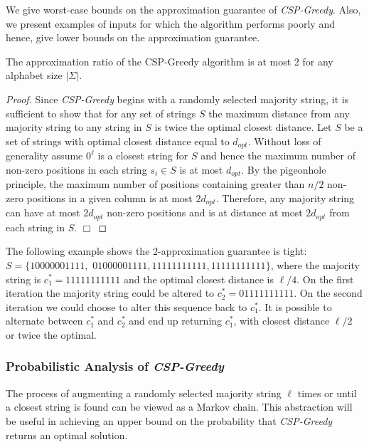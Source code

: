We give worst-case bounds on the approximation guarantee of {\em CSP-Greedy}.  Also, we present examples of inputs for which the algorithm performs poorly and hence, give lower bounds on the approximation guarantee.  

\begin{proposition} \label{2approx_theorem} The approximation ratio of the CSP-Greedy algorithm is at most 2 for any alphabet size $|\Sigma|$. \end{proposition}

\begin{proof} Since {\em CSP-Greedy} begins with a randomly selected majority string, it is sufficient to show that for any set of strings $S$ the maximum distance from any majority string to any string in $S$ is twice the optimal closest distance.  Let $S$ be a set of strings with optimal closest distance equal to $d_{opt}$.  Without loss of generality assume $0^{\ell}$ is a closest string for $S$ and hence the maximum number of non-zero positions in each string $s_i \in S$ is at most $d_{opt}$.  By the pigeonhole principle, the maximum number of positions containing greater than $n/2$ non-zero positions in a given column is at most $2d_{opt}$. Therefore, any majority string can have at most $2d_{opt}$ non-zero positions and is at distance at most $2d_{opt}$ from each string in $S$.  \hfill $\Box$  \end{proof}

\noindent The following example shows the 2-approximation guarantee is tight: $S = \{10000001111,$ $01000001111, 11111111111, 11111111111\}$, where the majority string is $c^*_1 = 11111111111$ and the optimal closest distance is $\ell/4$. On the first iteration the majority string could be altered to $c^*_2 = 01111111111$.  On the second iteration we could choose to alter this sequence back to $c^*_1$. It is possible to alternate between $c^*_1$ and $c^*_2$ and end up returning $c_1^*$, with closest distance $\ell/2$ or twice the optimal.

\subsubsection{Probabilistic Analysis of {\em CSP-Greedy}}
 
The process of augmenting a randomly selected majority string $\ell$ times or until a closest string is found can be viewed as a Markov chain.  This abstraction will be useful in achieving an upper bound on the probability that {\em CSP-Greedy} returns an optimal solution. 

